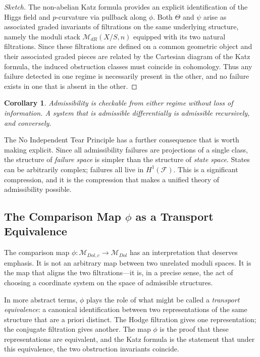 \documentclass[12pt]{article}
\newtheorem{corollary}{Corollary}
\begin{document}
\begin{proof}[Sketch]
The non-abelian Katz formula provides an explicit identification of the Higgs field
and $p$-curvature via pullback along $\phi$. Both $\Theta$ and $\psi$ arise as
associated graded invariants of filtrations on the same underlying structure, namely
the moduli stack $\mathcal{M}_{dR}(X/S,n)$ equipped with its two natural filtrations.
Since these filtrations are defined on a common geometric object and their associated
graded pieces are related by the Cartesian diagram of the Katz formula, the induced
obstruction classes must coincide in cohomology. Thus any failure detected in one
regime is necessarily present in the other, and no failure exists in one that is absent
in the other.
\end{proof}

\begin{corollary}
Admissibility is checkable from either regime without loss of information. A system
that is admissible differentially is admissible recursively, and conversely.
\end{corollary}

The No Independent Tear Principle has a further consequence that is worth making
explicit. Since all admissibility failures are projections of a single class, the
structure of \emph{failure space} is simpler than the structure of \emph{state space}.
States can be arbitrarily complex; failures all live in $H^1(\mathcal{F})$. This is a
significant compression, and it is the compression that makes a unified theory of
admissibility possible.

\subsection{The Comparison Map $\phi$ as a Transport Equivalence}

The comparison map $\phi : \mathcal{M}_{Dol,c} \to \mathcal{M}_{Dol}$ has an
interpretation that deserves emphasis. It is not an arbitrary map between two
unrelated moduli spaces. It is the map that aligns the two filtrations---it is, in a
precise sense, the act of choosing a coordinate system on the space of admissible
structures.

In more abstract terms, $\phi$ plays the role of what might be called a
\emph{transport equivalence}: a canonical identification between two representations
of the same structure that are a priori distinct. The Hodge filtration gives one
representation; the conjugate filtration gives another. The map $\phi$ is the proof
that these representations are equivalent, and the Katz formula is the statement that
under this equivalence, the two obstruction invariants coincide.
\end{document}
